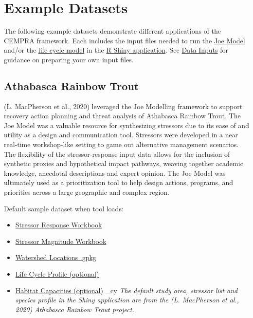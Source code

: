 \documentclass[
  letterpaper,
  DIV=11,
  numbers=noendperiod]{scrreprt}
\providecommand{\tightlist}{%
  \setlength{\itemsep}{0pt}\setlength{\parskip}{0pt}}
\begin{document}

\chapter{Example Datasets}\label{example-datasets}

The following example datasets demonstrate different applications of the
CEMPRA framework. Each includes the input files needed to run the
\hyperref[modelling-pathways-and-assessment-endpoints]{Joe Model} and/or
the \hyperref[life-cycle-model-population-model-overview]{life cycle
model} in the \hyperref[joe-model-shiny-app]{R Shiny application}. See
\hyperref[data-inputs]{Data Inputs} for guidance on preparing your own
input files.

\section{Athabasca Rainbow
Trout}\label{09_case_study_applications-09_case_study_applications-athabasca-rainbow-trout}

(L. MacPherson et al., 2020) leveraged the Joe Modelling framework to
support recovery action planning and threat analysis of Athabasca
Rainbow Trout. The Joe Model was a valuable resource for synthesizing
stressors due to its ease of and utility as a design and communication
tool. Stressors were developed in a near real-time workshop-like setting
to game out alternative management scenarios. The flexibility of the
stressor-response input data allows for the inclusion of synthetic
proxies and hypothetical impact pathways, weaving together academic
knowledge, anecdotal descriptions and expert opinion. The Joe Model was
ultimately used as a prioritization tool to help design actions,
programs, and priorities across a large geographic and complex region.

Default sample dataset when tool loads:

\begin{itemize}
\tightlist
\item
  \href{./sample_data/athabasca_rbt/stressor_response_demo.xlsx}{Stressor
  Response Workbook}
\item
  \href{./sample_data/athabasca_rbt/stressor_magnitude_demo.xlsx}{Stressor
  Magnitude Workbook}
\item
  \href{./sample_data/athabasca_rbt/watersheds.gpkg}{Watershed Locations
  .gpkg}
\item
  \href{./sample_data/athabasca_rbt/life_cycles.csv}{Life Cycle Profile
  (optional)}
\item
  \href{./sample_data/athabasca_rbt/habitat_capacities.csv}{Habitat
  Capacities (optional)} \_cy \emph{The default study area, stressor
  list and species profile in the Shiny application are from the (L.
  MacPherson et al., 2020) Athabasca Rainbow Trout project.}
\end{itemize}
\end{document}
